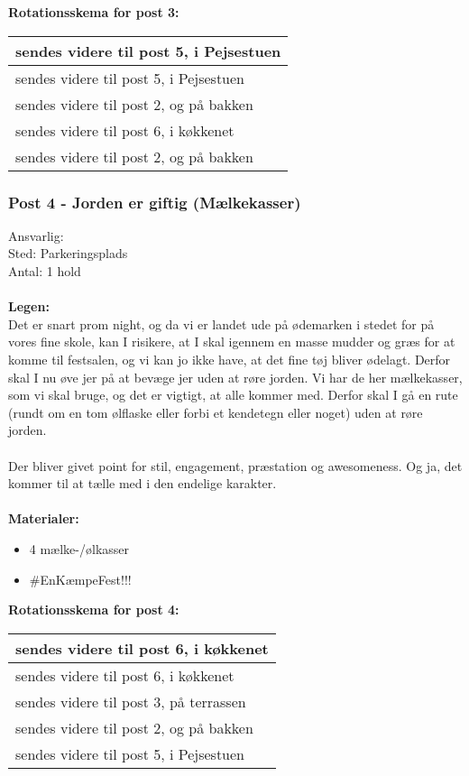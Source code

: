 \textbf{Rotationsskema for post 3:}\\
\begin{tabular}{ | l | }
\hline
	 \Fransk sendes videre til post 5, \KABS i Pejsestuen \\ \hline
	 \Norder sendes videre til post 5, \KABS i Pejsestuen \\ \hline
	 \Poppere sendes videre til post 2, \Lucyfar og \Gabriel på bakken \\ \hline
	 \Bad sendes videre til post 6, \Hyttebombz{} i køkkenet \\ \hline
	 \Alternative sendes videre til post 2, \Lucyfar og \Gabriel på bakken \\ \hline
\end{tabular}



\subsubsection{Post 4 - Jorden er giftig (Mælkekasser)}
Ansvarlig:	\Johnny \\
Sted: Parkeringsplads \\
Antal: 1 hold \\\\
\textbf{Legen:}\\
Det er snart prom night, og da vi er landet ude på ødemarken i stedet for på vores fine skole, kan I risikere, at I skal igennem en masse mudder og græs for at komme til festsalen, og vi kan jo ikke have, at det fine tøj bliver ødelagt. Derfor skal I nu øve jer på at bevæge jer uden at røre jorden. Vi har de her mælkekasser, som vi skal bruge, og det er vigtigt, at alle kommer med.
Derfor skal I gå en rute (rundt om en tom ølflaske eller forbi et kendetegn eller noget) uden at røre jorden. \\\\
Der bliver givet point for stil, engagement, præstation og awesomeness. Og ja, det kommer til at tælle med i den endelige karakter.\\\\
\textbf{Materialer:}
\begin{multicols}{2}
\begin{itemize}
\item 4 mælke-/ølkasser
\item \#EnKæmpeFest!!!
\end{itemize}
\end{multicols}

\textbf{Rotationsskema for post 4:}\\
\begin{tabular}{ | l | }
\hline
	 \Alternative sendes videre til post 6, \Hyttebombz{} i køkkenet \\ \hline
	 \Hippier sendes videre til post 6, \Hyttebombz{} i køkkenet \\ \hline
	 \Bad sendes videre til post 3, \Ora på terrassen \\ \hline
	 \Norder sendes videre til post 2, \Lucyfar og \Gabriel på bakken \\ \hline
	 \Poppere sendes videre til post 5, \KABS i Pejsestuen \\ \hline
\end{tabular}



